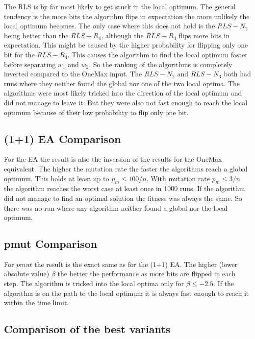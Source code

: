 

The RLS is by far most likely to get stuck in the local optimum.
The general tendency is the more bits the algorithm flips in expectation the more unlikely the local optimum becomes.
The only case where this does not hold is the $RLS-N_2$ being better than the $RLS-R_4$, although the $RLS-R_4$ flips more bits in expectation.
This might be caused by the higher probability for flipping only one bit for the $RLS-R_4$.
This causes the algorithm to find the local optimum faster before separating $w_1$ and $w_2$.
So the ranking of the algorithms is completely inverted compared to the OneMax input.
The $RLS-N_2$ and $RLS-N_3$ both had runs where they neither found the global nor one of the two local optima.
The algorithms were most likely tricked into the direction of the local optimum and did not manage to leave it.
But they were also not fast enough to reach the local optimum because of their low probability to flip only one bit.
\subsection{(1+1) EA Comparison}




For the EA the result is also the inversion of the results for the OneMax equivalent.
The higher the mutation rate the faster the algorithms reach a global optimum.
This holds at least up to $p_m\le100/n$.
With mutation rate $p_m\le3/n$ the algorithm reaches the worst case at least once in 1000 runs.
If the algorithm did not manage to find an optimal solution the fitness was always the same.
So there was no run where any algorithm neither found a global nor the local optimum.
\subsection{pmut Comparison}




For $pmut$ the result is the exact same as for the (1+1) EA.
The higher (lower absolute value) $\beta$ the better the performance as more bits are flipped in each step.
The algorithm is tricked into the local optima only for $\beta\le-2.5$.
If the algorithm is on the path to the local optimum it is always fast enough to reach it within the time limit.
\subsection{Comparison of the best variants}


